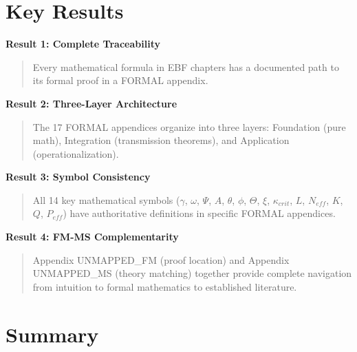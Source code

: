 \section{Key Results}
\label{sec:fm-results}

\begin{tcolorbox}[colback=green!5!white, colframe=green!75!black,
    title=\textbf{Key Results of This Appendix}]

\textbf{Result 1: Complete Traceability}
\begin{quote}
Every mathematical formula in EBF chapters has a documented path to its formal proof in a FORMAL appendix.
\end{quote}

\textbf{Result 2: Three-Layer Architecture}
\begin{quote}
The 17 FORMAL appendices organize into three layers: Foundation (pure math), Integration (transmission theorems), and Application (operationalization).
\end{quote}

\textbf{Result 3: Symbol Consistency}
\begin{quote}
All 14 key mathematical symbols ($\gamma$, $\omega$, $\Psi$, $A$, $\theta$, $\phi$, $\Theta$, $\xi$, $\kappa_{crit}$, $L$, $N_{eff}$, $K$, $Q$, $P_{eff}$) have authoritative definitions in specific FORMAL appendices.
\end{quote}

\textbf{Result 4: FM-MS Complementarity}
\begin{quote}
Appendix UNMAPPED_FM (proof location) and Appendix UNMAPPED_MS (theory matching) together provide complete navigation from intuition to formal mathematics to established literature.
\end{quote}

\end{tcolorbox}

\section{Summary}
\label{sec:fm-summary}

